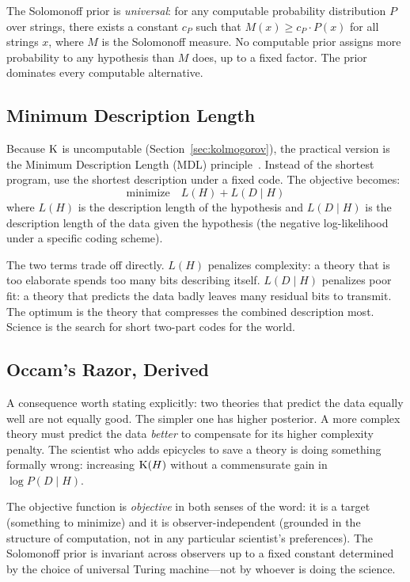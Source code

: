 The Solomonoff prior is \emph{universal}: for any computable probability
distribution $P$ over strings, there exists a constant $c_P$ such that
$M(x) \geq c_P \cdot P(x)$ for all strings $x$, where $M$ is the Solomonoff
measure. No computable prior assigns more probability to any hypothesis than
$M$ does, up to a fixed factor. The prior dominates every computable
alternative.

\subsection{Minimum Description Length}

Because $\mathrm{K}$ is uncomputable (Section~\ref{sec:kolmogorov}), the practical
version is the Minimum Description Length (MDL) principle~\cite{rissanen1978}.
Instead of the shortest program, use the shortest description under a fixed
code. The objective becomes:
\begin{equation}
  \text{minimize} \quad L(H) + L(D \mid H)
  \label{eq:mdl}
\end{equation}
where $L(H)$ is the description length of the hypothesis and $L(D \mid H)$
is the description length of the data given the hypothesis (the negative
log-likelihood under a specific coding scheme).

The two terms trade off directly. $L(H)$ penalizes complexity: a theory that
is too elaborate spends too many bits describing itself. $L(D \mid H)$
penalizes poor fit: a theory that predicts the data badly leaves many residual
bits to transmit. The optimum is the theory that compresses the combined
description most. Science is the search for short two-part codes for the world.

\subsection{Occam's Razor, Derived}

A consequence worth stating explicitly: two theories that predict the data
equally well are not equally good. The simpler one has higher posterior. A
more complex theory must predict the data \emph{better} to compensate for its
higher complexity penalty. The scientist who adds epicycles to save a theory is
doing something formally wrong: increasing $\mathrm{K}(H)$ without a commensurate gain
in $\log P(D \mid H)$.

The objective function is \emph{objective} in both senses of the word: it is
a target (something to minimize) and it is observer-independent (grounded in
the structure of computation, not in any particular scientist's preferences).
The Solomonoff prior is invariant across observers up to a fixed constant
determined by the choice of universal Turing machine---not by whoever is doing
the science.